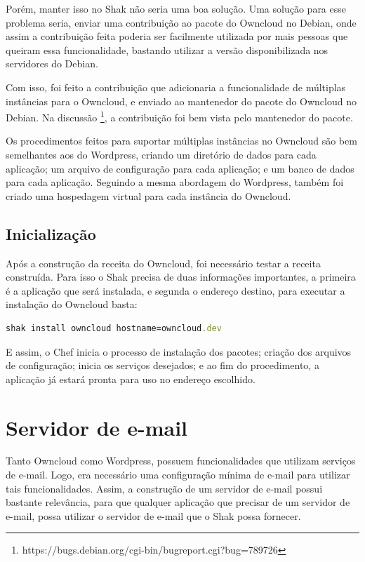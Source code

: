 Porém, manter isso no Shak não seria uma boa solução. Uma solução para esse problema seria, 
enviar uma contribuição ao pacote do Owncloud no Debian, onde assim a contribuição feita
poderia ser facilmente utilizada por mais pessoas que queiram essa funcionalidade,
bastando utilizar a versão disponibilizada nos servidores do Debian. 

Com isso, foi feito a contribuição que adicionaria a funcionalidade de múltiplas 
instâncias para o Owncloud, e enviado ao mantenedor do pacote do Owncloud no Debian. 
Na discussão \footnote{https://bugs.debian.org/cgi-bin/bugreport.cgi?bug=789726},
a contribuição foi bem vista pelo mantenedor do pacote.
 
Os procedimentos feitos para suportar múltiplas instâncias
no Owncloud são bem semelhantes aos do Wordpress, criando um diretório de dados
para cada aplicação; um arquivo de configuração para cada aplicação; e um banco de
dados para cada aplicação. Seguindo a mesma abordagem do Wordpress, também
foi criado uma hospedagem virtual para cada instância do Owncloud.

\subsection{Inicialização}

Após a construção da receita do Owncloud, foi necessário testar a receita construída. 
Para isso o Shak precisa de duas informações importantes, a primeira é a aplicação
que será instalada, e segunda o endereço destino, para executar a instalação
do Owncloud basta:

\begin{lstlisting}[language=Ruby,label=dice_index,caption={Exemplo de execução de instalação do Owncloud com shak}]
shak install owncloud hostname=owncloud.dev
\end{lstlisting}

E assim, o Chef inicia o processo de instalação dos pacotes; criação dos arquivos
de configuração; inicia os serviços desejados; e ao fim do procedimento, a aplicação
já estará pronta para uso no endereço escolhido.

\section{Servidor de e-mail}
\label{sub:e-mail}

Tanto Owncloud como Wordpress, possuem funcionalidades que utilizam serviços 
de e-mail. Logo, era necessário uma configuração mínima de e-mail para utilizar 
tais funcionalidades. Assim, a construção de um servidor de e-mail 
possui bastante relevância, para que qualquer aplicação que precisar de um 
servidor de e-mail, possa utilizar o servidor de e-mail que o Shak possa fornecer.

